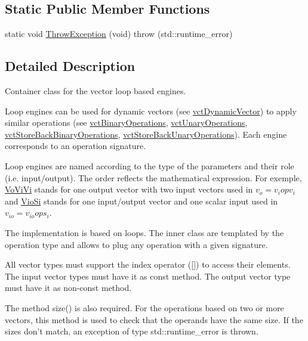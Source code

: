 \subsection*{Static Public Member Functions}
\begin{DoxyCompactItemize}
\item 
static void \hyperlink{classvct_dynamic_vector_loop_engines_a11c15e614e735c9fc969b955f967c5a8}{Throw\-Exception} (void)  throw (std\-::runtime\-\_\-error)
\end{DoxyCompactItemize}


\subsection{Detailed Description}
Container class for the vector loop based engines. 

Loop engines can be used for dynamic vectors (see \hyperlink{classvct_dynamic_vector}{vct\-Dynamic\-Vector}) to apply similar operations (see \hyperlink{classvct_binary_operations}{vct\-Binary\-Operations}, \hyperlink{classvct_unary_operations}{vct\-Unary\-Operations}, \hyperlink{classvct_store_back_binary_operations}{vct\-Store\-Back\-Binary\-Operations}, \hyperlink{classvct_store_back_unary_operations}{vct\-Store\-Back\-Unary\-Operations}). Each engine corresponds to an operation signature.

Loop engines are named according to the type of the parameters and their role (i.\-e. input/output). The order reflects the mathematical expression. For exemple, \hyperlink{classvct_dynamic_vector_loop_engines_1_1_vo_vi_vi}{Vo\-Vi\-Vi} stands for one output vector with two input vectors used in $v_o = v_i op v_i$ and \hyperlink{classvct_dynamic_vector_loop_engines_1_1_vio_si}{Vio\-Si} stands for one input/output vector and one scalar input used in $v_{io} = v_{io} op s_i$.

The implementation is based on loops. The inner class are templated by the operation type and allows to plug any operation with a given signature.

All vector types must support the index operator (\mbox{[}\mbox{]}) to access their elements. The input vector types must have it as const method. The output vector type must have it as non-\/const method.

The method size() is also required. For the operations based on two or more vectors, this method is used to check that the operands have the same size. If the sizes don't match, an exception of type std\-::runtime\-\_\-error is thrown.

